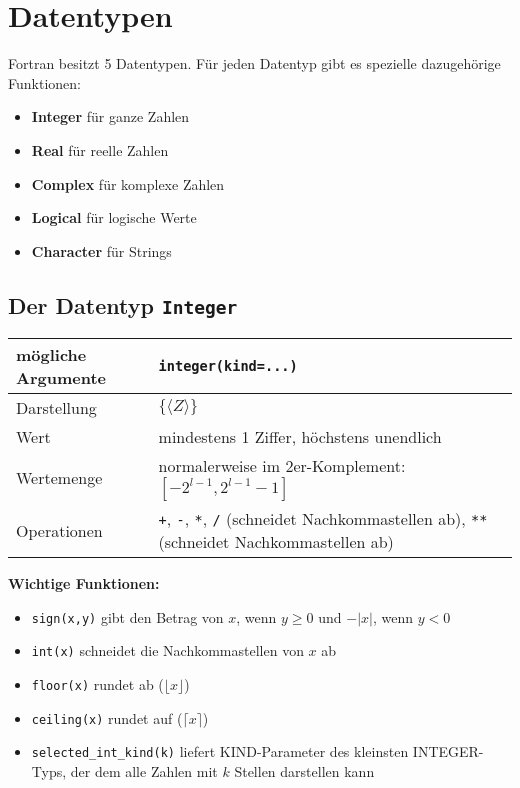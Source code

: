 \section{Datentypen}

Fortran besitzt 5 Datentypen. Für jeden Datentyp gibt es spezielle dazugehörige Funktionen:
\begin{itemize}
	\item \textbf{Integer} für ganze Zahlen
	\item \textbf{Real} für reelle Zahlen
	\item \textbf{Complex} für komplexe Zahlen
	\item \textbf{Logical} für logische Werte
	\item \textbf{Character} für Strings
\end{itemize}

\subsection{Der Datentyp \texttt{Integer}}
	\begin{tabular}{l|l}
		mögliche Argumente & \texttt{integer(kind=...)} \\
		\hline
		Darstellung & $\{\langle Z\rangle\}$ \\
		\hline
		Wert & mindestens 1 Ziffer, höchstens unendlich \\
		\hline
		Wertemenge & normalerweise im 2er-Komplement: $\left[ -2^{l-1},2^{l-1}-1 \right]$ \\
		\hline
		Operationen & \texttt{+}, \texttt{-}, \texttt{*}, \texttt{/} (schneidet Nachkommastellen ab), \texttt{**} (schneidet Nachkommastellen ab)
	\end{tabular}

\textbf{Wichtige Funktionen:}
\begin{itemize}
	\item\texttt{sign(x,y)} gibt den Betrag von $x$, wenn $y\ge 0$ und $-\vert x\vert$, wenn $y<0$
	\item\texttt{int(x)} schneidet die Nachkommastellen von $x$ ab
	\item\texttt{floor(x)} rundet ab ($\lfloor x\rfloor$)
	\item\texttt{ceiling(x)} rundet auf ($\lceil x\rceil$)
	\item\texttt{selected\_int\_kind(k)} liefert KIND-Parameter des kleinsten INTEGER-Typs, der dem alle Zahlen mit $k$ Stellen darstellen kann
\end{itemize}

